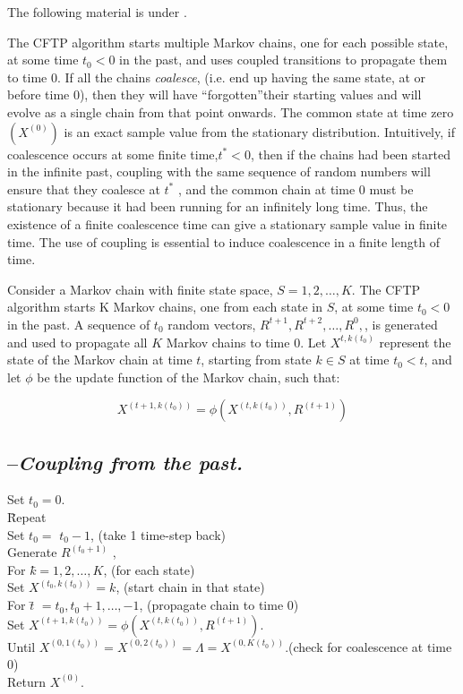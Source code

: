 The following material is under \work.
\begin{demo}
The CFTP algorithm starts multiple Markov chains, one for each possible state, at some time $t_0<0$ in the past, and uses coupled transitions to propagate them to time 0. If all the chains {\it coalesce}, (i.e. end up having the same state, at or before time 0), then they will have \textquotedblleft forgotten\textquotedblright their starting values and will evolve as a single chain from that point onwards. The common state at time zero $(X^{(0)})$ is an exact sample value from the stationary distribution. Intuitively, if coalescence occurs at some finite time,$t^{*}<0$, then if the chains had been started in the infinite past, coupling with the same sequence of random numbers will ensure that they coalesce at $t^*$ , and the common chain at time 0 must be stationary because it had been running for an infinitely long time. Thus, the existence of a finite coalescence time can give a stationary sample value in finite time. The use of coupling is essential to induce coalescence in a finite length of time.

Consider a Markov chain with finite state space, $S = {1, 2,\ldots, K}$. The CFTP algorithm starts K Markov chains, one from each state in $S$, at some time $t_0<0$ in the past. A sequence of $t_0$ random vectors, $R^{t+1},R^{t+2},\ldots,R^{0},$, is generated and used to propagate all $K$ Markov chains to time 0. Let $X^{t,k(t_0)}$ represent the state of the Markov chain at time $t$, starting from state $k\in S$ at time $t_0<t$, and let $\phi$ be the update function of the Markov chain, such that:

\begin{equation}
X^{(t+1,k(t_0))}=\phi(X^{(t,k(t_0))},R^{(t+1)})
\end{equation}
\subsection{\alg --{\it Coupling from the past.}}

\begin{tabbing}
Set $t_0=0$.\\
\=Repeat\=\\
		\>\>Set  $t_0=$ $t_0-1$, (take 1 time-step back)\\
		\>\>Generate $R^{(t_0+1)}$ ,\\
		\>\>For $k$\=$=1, 2,\ldots, K$, (for each state)\\
				\>\>\>Set $X^{(t_0,k(t_0))}=k$, (start chain in that state)\\
				\>\>\>For $t$\= $=t_0,t_0+1,\ldots,-1$, (propagate chain to time 0)\\
						\>\>\>\>Set $X^{(t+1,k(t_0))}=\phi(X^{(t,k(t_0))},R^{(t+1)})$.\\
Until $X^{(0,1(t_0))}=X^{(0,2(t_0))}=\Lambda=X^{(0,K(t_0))}$.(check for coalescence at time 0)\\
Return $X^{(0)}$.\\
\end{tabbing}
\end{demo}

